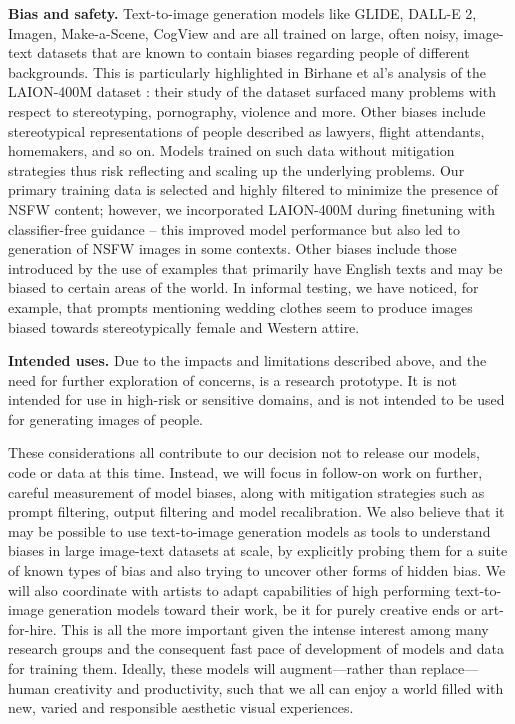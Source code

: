 \textbf{Bias and safety.} Text-to-image generation models like GLIDE, DALL-E 2, Imagen, Make-a-Scene, CogView and \bdraw are all trained on large, often noisy, image-text datasets that are known to contain biases regarding people of different backgrounds. This is particularly highlighted in Birhane et al's \cite{birhane2021multimodal} analysis of the LAION-400M dataset \cite{schuhmann2021laion}: their study of the dataset surfaced many problems with respect to stereotyping, pornography, violence and more. Other biases include stereotypical representations of people described as lawyers, flight attendants, homemakers, and so on. Models trained on such data without mitigation strategies thus risk reflecting and scaling up the underlying problems. Our primary training data is selected and highly filtered to minimize the presence of NSFW content; however, we incorporated LAION-400M during finetuning with classifier-free guidance -- this improved model performance but also led to generation of NSFW images in some contexts. Other biases include those introduced by the use of examples that primarily have English texts and may be biased to certain areas of the world. In informal testing, we have noticed, for example, that prompts mentioning wedding clothes seem to produce images biased towards stereotypically female and Western attire.

\textbf{Intended uses.} Due to the impacts and limitations described above, and the need for further exploration of concerns, \bdraw is a research prototype. It is not intended for use in high-risk or sensitive domains, and is not intended to be used for generating images of people.

These considerations all contribute to our decision not to release our models, code or data at this time. Instead, we will focus in follow-on work on further, careful measurement of model biases, along with mitigation strategies such as prompt filtering, output filtering and model recalibration. We also believe that it may be possible to use text-to-image generation models as tools to understand biases in large image-text datasets at scale, by explicitly probing them for a suite of known types of bias and also trying to uncover other forms of hidden bias.  We will also coordinate with artists to adapt capabilities of high performing text-to-image generation models toward their work, be it for purely creative ends or art-for-hire. This is all the more important given the intense interest among many research groups and the consequent fast pace of development of models and data for training them. Ideally, these models will augment---rather than replace---human creativity and productivity, such that we all can enjoy a world filled with new, varied and responsible aesthetic visual experiences.